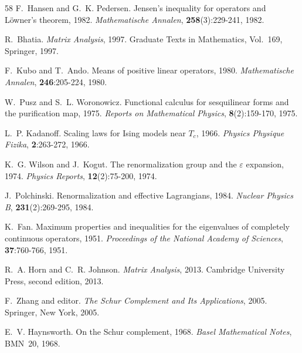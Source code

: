 \documentclass[11pt]{article}
\numberwithin{equation}{section}
\theoremstyle{thmcompact}
\theoremstyle{remark}
\begin{document}
\begin{thebibliography}{58}
{F.~Hansen} and {G.~K. Pedersen}.
\newblock Jensen's inequality for operators and {L}{\"o}wner's theorem, 1982.
\newblock \emph{Mathematische Annalen}, \textbf{258}(3):229-241, 1982.

{R.~Bhatia}.
\newblock \emph{Matrix Analysis}, 1997.
\newblock Graduate Texts in Mathematics, Vol.~169, Springer, 1997.

{F.~Kubo} and {T.~Ando}.
\newblock Means of positive linear operators, 1980.
\newblock \emph{Mathematische Annalen}, \textbf{246}:205-224, 1980.

{W.~Pusz} and {S.~L. Woronowicz}.
\newblock Functional calculus for sesquilinear forms and the purification map,
  1975.
\newblock \emph{Reports on Mathematical Physics}, \textbf{8}(2):159-170, 1975.

{L.~P. Kadanoff}.
\newblock Scaling laws for {I}sing models near ${T}_c$, 1966.
\newblock \emph{Physics Physique Fizika}, \textbf{2}:263-272, 1966.

{K.~G. Wilson} and {J.~Kogut}.
\newblock The renormalization group and the $\varepsilon$ expansion, 1974.
\newblock \emph{Physics Reports}, \textbf{12}(2):75-200, 1974.

{J.~Polchinski}.
\newblock Renormalization and effective {L}agrangians, 1984.
\newblock \emph{Nuclear Physics B}, \textbf{231}(2):269-295, 1984.

{K.~Fan}.
\newblock Maximum properties and inequalities for the eigenvalues of completely
  continuous operators, 1951.
\newblock \emph{Proceedings of the National Academy of Sciences},
  \textbf{37}:760-766, 1951.

{R.~A. Horn} and {C.~R. Johnson}.
\newblock \emph{Matrix Analysis}, 2013.
\newblock Cambridge University Press, second edition, 2013.

{F.~Zhang} and {editor}.
\newblock \emph{The Schur Complement and Its Applications}, 2005.
\newblock Springer, New York, 2005.

{E.~V. Haynsworth}.
\newblock On the {S}chur complement, 1968.
\newblock \emph{Basel Mathematical Notes}, BMN~20, 1968.


\end{thebibliography}
\end{document}
